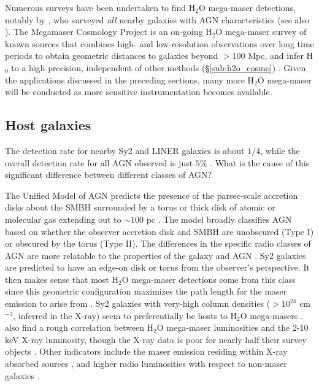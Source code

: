 Numerous surveys have been undertaken to find H$_2$O mega-maser detections, notably by \citet{Braatz_1996}, who surveyed {\it all} nearby galaxies with AGN characteristics (see also \citet{Braatz_1997}). The Megamaser Cosmology Project is an on-going H$_2$O mega-maser survey of known sources that combines high- and low-resolution observations over long time periods to obtain geometric distances to galaxies beyond $\gt 100$ Mpc, and infer H$_0$ to a high precision, independent of other methods (\S\ref{sub:h2o_cosmo}) \citep{reid2009_mmproject_I}. Given the applications discussed in the preceding sections, many more H$_2$O mega-maser will be conducted as more sensitive instrumentation becomes available.

\subsection{Host galaxies}
\label{sub:h2o_hosts}

The detection rate for nearby Sy2 and LINER galaxies is about $1/4$, while the overall detection rate for all AGN observed is just $5\%$ \citep{tarchi2012}. What is the cause of this significant difference between different classes of AGN?

The Unified Model of AGN predicts the presence of the parsec-scale accretion disks about the SMBH surrounded by a torus or thick disk of atomic or molecular gas extending out to $\sim 100$ pc \citep[e.g.,]{Urry_1995}. The model broadly classifies AGN based on whether the observer accretion disk and SMBH are unobscured (Type I) or obscured by the torus (Type II). The differences in the specific radio classes of AGN are more relatable to the properties of the galaxy and AGN \citep{tarchi2012}. Sy2 galaxies are predicted to have an edge-on disk or torus from the observer's perspective. It then makes sense that most H$_2$O mega-maser detections come from this class since this geometric configuration maximizes the path length for the maser emission to arise from \citep{tarchi2012}.  Sy2 galaxies with very-high column densities ($\gt10^{24}$ cm$^{-3}$, inferred in the X-ray) seem to preferentially be hosts to H$_2$O mega-masers \citep{Braatz_1997,Greenhill_2003}. \citet{Kondratko_2006} also find a rough correlation between H$_2$O mega-maser luminosities and the 2-10 keV X-ray luminosity, though the X-ray data is poor for nearly half their survey objects \citet{tarchi2012}. Other indicators include the maser emission residing within X-ray absorbed sources \citep[e.g.,]{Zhang_2010}, and higher radio luminosities with respect to non-maser galaxies \citep{Zhang_2012}.


